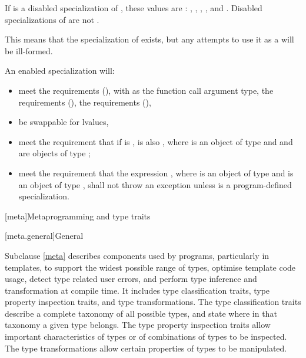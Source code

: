 \pnum
If  is a disabled specialization of ,
these values are :
,
,
,
, and
.
Disabled specializations of 
are not .
\begin{note}
This means that the specialization of  exists, but
any attempts to use it as a  will be ill-formed.
\end{note}

\pnum
An enabled specialization  will:
\begin{itemize}
\item meet the  requirements (),
with  as the function
call argument type, the  requirements (),
the  requirements (),
\item be swappable for lvalues,
\item meet the requirement that if  is ,  is
also , where  is an object of type  and  and 
are objects of type ;
\item meet the requirement that the expression , where 
is an object of type  and  is an object of type
, shall not throw an exception unless  is a
program-defined specialization.
\end{itemize}

[meta]{Metaprogramming and type traits}

[meta.general]{General}

\pnum
Subclause \ref{meta} describes components used by \Cpp{} programs, particularly in
templates, to support the widest possible range of types, optimise
template code usage, detect type related user errors, and perform
type inference and transformation at compile time. It includes type
classification traits, type property inspection traits, and type
transformations. The type classification traits describe a complete taxonomy
of all possible \Cpp{} types, and state where in that taxonomy a given
type belongs. The type property inspection traits allow important
characteristics of types or of combinations of types to be inspected. The
type transformations allow certain properties of types to be manipulated.

